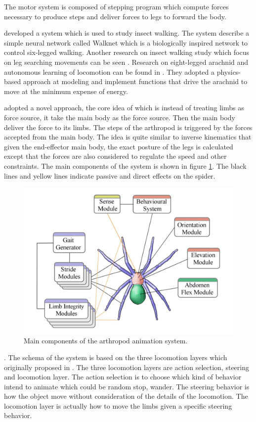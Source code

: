 The motor system is composed of stepping program which compute forces
necessary to produce steps and deliver forces to legs to forward the body.


\cite{arsimu3} developed a system which is used to study insect
walking. The system describe a simple neural network called Walknet
which is a biologically inspired network to control six-legged
walking. Another research on insect walking study which focus on leg
searching movements can be seen \cite{arsimu6}.
Research on eight-legged arachnid and autonomous learning of
locomotion can be found in \cite{arsimu4}. They adopted a
physics-based approach at modeling and implement functions that drive the arachnid to move
at the minimum expense of energy.



\cite{thesis} adopted a novel approach, the core idea of which is instead of treating limbs as force source, it take the main body as the force source. Then the main body deliver the force to its limbs. The steps of the arthropod is triggered by the forces accepted from the main body. The idea is quite similar to inverse kinematics that given the end-effector main body, the exact posture of the legs is calculated except that the forces are also considered to regulate the speed and other constraints. The main components of the system is shown in figure \ref{fig:spider_module}. The black lines and yellow lines indicate passive and direct effects on the spider.
\begin{figure}[ht!]
\centering
\includegraphics[height=8 cm]{figures/spider_module.png}
\caption{Main components of the arthropod animation system. \protect\cite{thesis}}
\label{fig:spider_module}
\end{figure}.
The schema of the system is based on the three locomotion layers which originally proposed in \cite{steering}. The three locomotion layers are action selection, steering and locomotion layer. The action selection is to choose which kind of behavior intend to animate which could be random stop, wander. The steering behavior is how the object move without consideration of the details of the locomotion. The locomotion layer is actually how to move the limbs given a specific steering behavior. 
